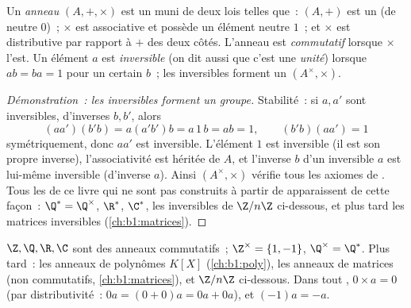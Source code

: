 \begin{definition}[Anneau]\label{def:b1:structures:ring}
Un \emph{anneau} $(A, +, \times)$ est un  muni de
deux lois telles que~: $(A, +)$ est un  (de neutre $0$)~;
$\times$ est associative et possède un élément neutre $1$~; et $\times$
est distributive par rapport à $+$ des deux côtés. L'anneau est
\emph{commutatif} lorsque $\times$ l'est. Un élément $a$ est
\emph{inversible} (on dit aussi que c'est une \emph{unité}) lorsque
$ab = ba = 1$ pour un certain $b$~; les inversibles forment un 
$(A^\times, \times)$.
\end{definition}

\begin{proof}[Démonstration~: les inversibles forment un groupe]
Stabilité~: si $a, a'$ sont inversibles, d'inverses $b, b'$, alors
\[
(aa')(b'b) = a(a'b')b = a\,1\,b = ab = 1,
\qquad (b'b)(aa') = 1
\]
symétriquement, donc $aa'$ est inversible. L'élément $1$ est
inversible (il est son propre inverse), l'associativité est héritée
de $A$, et l'inverse $b$ d'un inversible $a$ est lui-même inversible
(d'inverse $a$). Ainsi $(A^\times, \times)$ vérifie tous les axiomes
de . Tous les  de ce livre qui ne sont pas construits à
partir de  apparaissent de cette façon~:
$\Q^* = \Q^\times$, $\R^*$, $\C^*$, les inversibles de $\Z/n\Z$
ci-dessous, et plus tard les matrices inversibles
(\cref{ch:b1:matrices}).
\end{proof}

\begin{example}\label{ex:b1:structures:rings}
$\Z, \Q, \R, \C$ sont des anneaux commutatifs~; $\Z^\times = \{1, -1\}$,
$\Q^\times = \Q^*$. Plus tard~: les anneaux de polynômes $K[X]$
(\cref{ch:b1:poly}), les anneaux de matrices (non commutatifs,
\cref{ch:b1:matrices}), et $\Z/n\Z$ ci-dessous. Dans tout ,
$0 \times a = 0$ (par distributivité~: $0a = (0+0)a = 0a + 0a$), et
$(-1)a = -a$.
\end{example}

